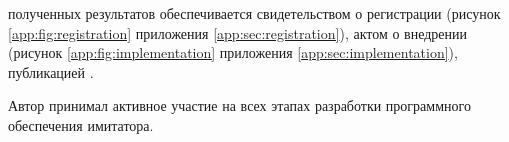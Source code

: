 
{\reliability} полученных результатов обеспечивается
  свидетельством о регистрации (рисунок \ref{app:fig:registration} приложения \ref{app:sec:registration}),
  актом о внедрении (рисунок \ref{app:fig:implementation} приложения \ref{app:sec:implementation}),  
  публикацией \cite{bib:my:ttd_with_patterns_2019}.



{\contribution} Автор принимал активное участие на всех этапах разработки программного обеспечения имитатора.
